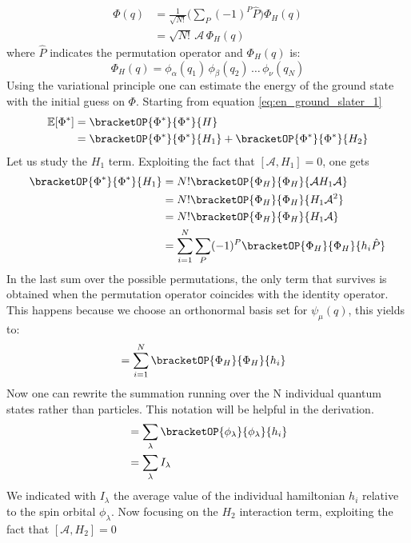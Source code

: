 \begin{align*}
    \Phi(q) &= \frac{1}{\sqrt{N!}}\bigg(\sum_P (-1)^P \hat{P} \bigg) \Phi_H(q) \\
     &= \sqrt{N!} \, \mathcal{A} \, \Phi_H(q)
\end{align*}
where $\hat{P}$ indicates the permutation operator and $\Phi_H(q)$ is:
\begin{equation*}
    \Phi_H(q) = \phi_\alpha(q_1) \, \phi_\beta(q_2) \, \dots \, \phi_\nu(q_N)  
\end{equation*}
Using the variational principle one can estimate the energy of the ground state with the initial guess on $\Phi$.
Starting from equation \ref{eq:en_ground_slater_1}
\begin{align*}
    \mathbb{E}[\Phi^*] &= \bracketOP{\Phi^*}{\Phi^*}{H} \\
    &= \bracketOP{\Phi^*}{\Phi^*}{H_1} + \bracketOP{\Phi^*}{\Phi^*}{H_2}
\end{align*}
Let us study the $H_1$ term. Exploiting the fact that $[\mathcal{A}, H_1]=0$, one gets 
\begin{align*}
    \bracketOP{\Phi^*}{\Phi^*}{H_1} &= N! \bracketOP{\Phi_H}{\Phi_H}{\mathcal{A}H_1\mathcal{A}} \\
    &= N! \bracketOP{\Phi_H}{\Phi_H}{H_1\mathcal{A}^2} \\
    &= N! \bracketOP{\Phi_H}{\Phi_H}{H_1\mathcal{A}} \\
    &= \sum_{i=1}^N \sum_P (-1)^P \bracketOP{\Phi_H}{\Phi_H}{h_i\hat{P}} \\
\end{align*}
In the last sum over the possible permutations, the only term that survives  is obtained when the permutation operator coincides with the identity operator. This happens because we choose an orthonormal basis set for $\psi_{\mu}(q)$, this yields to: 
\begin{align*}
    &= \sum_{i=1}^N  \bracketOP{\Phi_H}{\Phi_H}{h_i}
\end{align*}
Now one can rewrite the summation running over the N individual quantum states rather than particles. 
This notation will be helpful in the derivation. 
\begin{align*}
    &= \sum_{\lambda} \bracketOP{\phi_\lambda}{\phi_\lambda}{h_i}\\
    &= \sum_{\lambda} I_\lambda
\end{align*}
We indicated with $I_{\lambda}$ the average value of the individual hamiltonian $h_i$ relative to the spin orbital $\phi_{\lambda}$.
Now focusing on the $H_2$ interaction term, exploiting the fact that $[\mathcal{A}, H_2]=0$
